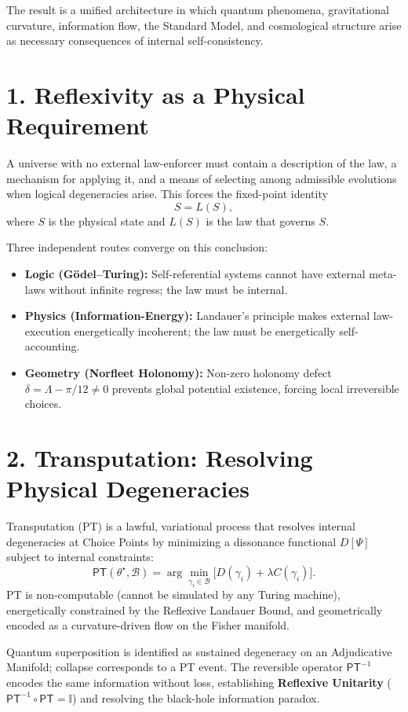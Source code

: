 \documentclass[11pt]{article}
\newcommand{\PT}{\ensuremath{{\mathsf{PT}}}}
\begin{document}
The result is a unified architecture in which quantum phenomena, gravitational curvature,
information flow, the Standard Model, and cosmological structure arise as necessary consequences
of internal self-consistency.

\section*{1. Reflexivity as a Physical Requirement}

A universe with no external law-enforcer must contain a description of the law, a mechanism for
applying it, and a means of selecting among admissible evolutions when logical degeneracies arise.
This forces the fixed-point identity
\[
S = L(S),
\]
where $S$ is the physical state and $L(S)$ is the law that governs $S$.

Three independent routes converge on this conclusion:
\begin{itemize}
    \item \textbf{Logic (Gödel--Turing):} Self-referential systems cannot have external meta-laws
    without infinite regress; the law must be internal.
    \item \textbf{Physics (Information-Energy):} Landauer's principle makes external law-execution
    energetically incoherent; the law must be energetically self-accounting.
    \item \textbf{Geometry (Norfleet Holonomy):} Non-zero holonomy defect $\delta = \Lambda - \pi/12
    \neq 0$ prevents global potential existence, forcing local irreversible choices.
\end{itemize}

\section*{2. Transputation: Resolving Physical Degeneracies}

Transputation (PT) is a lawful, variational process that resolves internal degeneracies at
Choice Points by minimizing a dissonance functional $D[\Psi]$ subject to internal constraints:
\[
\PT(\theta^\star, \mathcal{B}) = \arg\min_{\gamma_i \in \mathcal{B}} \bigl[D(\gamma_i) + \lambda C(\gamma_i)\bigr].
\]
PT is non-computable (cannot be simulated by any Turing machine), energetically constrained
by the Reflexive Landauer Bound, and geometrically encoded as a curvature-driven flow on the
Fisher manifold.

Quantum superposition is identified as sustained degeneracy on an Adjudicative Manifold; collapse
corresponds to a PT event. The reversible operator $\PT^{-1}$ encodes the same information without
loss, establishing \textbf{Reflexive Unitarity} ($\PT^{-1} \circ \PT = \mathbb{I}$) and resolving
the black-hole information paradox.
\end{document}
